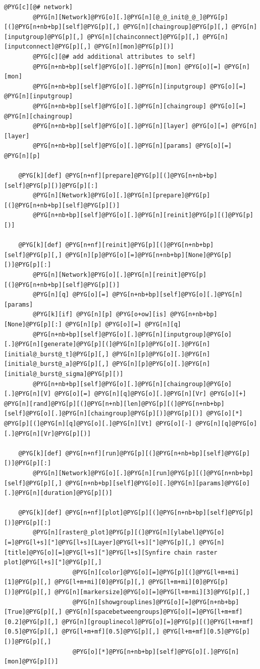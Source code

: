 \documentclass[letterpaper,10pt,english]{manual}
\begin{document}
\begin{Verbatim}[commandchars=@\[\]]
        @PYG[c][@# network]
        @PYG[n][Network]@PYG[o][.]@PYG[n][@_@_init@_@_]@PYG[p][(]@PYG[n+nb+bp][self]@PYG[p][,] @PYG[n][chaingroup]@PYG[p][,] @PYG[n][inputgroup]@PYG[p][,] @PYG[n][chainconnect]@PYG[p][,] @PYG[n][inputconnect]@PYG[p][,] @PYG[n][mon]@PYG[p][)]
        @PYG[c][@# add additional attributes to self]
        @PYG[n+nb+bp][self]@PYG[o][.]@PYG[n][mon] @PYG[o][=] @PYG[n][mon]
        @PYG[n+nb+bp][self]@PYG[o][.]@PYG[n][inputgroup] @PYG[o][=] @PYG[n][inputgroup]
        @PYG[n+nb+bp][self]@PYG[o][.]@PYG[n][chaingroup] @PYG[o][=] @PYG[n][chaingroup]
        @PYG[n+nb+bp][self]@PYG[o][.]@PYG[n][layer] @PYG[o][=] @PYG[n][layer]
        @PYG[n+nb+bp][self]@PYG[o][.]@PYG[n][params] @PYG[o][=] @PYG[n][p]

    @PYG[k][def] @PYG[n+nf][prepare]@PYG[p][(]@PYG[n+nb+bp][self]@PYG[p][)]@PYG[p][:]
        @PYG[n][Network]@PYG[o][.]@PYG[n][prepare]@PYG[p][(]@PYG[n+nb+bp][self]@PYG[p][)]
        @PYG[n+nb+bp][self]@PYG[o][.]@PYG[n][reinit]@PYG[p][(]@PYG[p][)]

    @PYG[k][def] @PYG[n+nf][reinit]@PYG[p][(]@PYG[n+nb+bp][self]@PYG[p][,] @PYG[n][p]@PYG[o][=]@PYG[n+nb+bp][None]@PYG[p][)]@PYG[p][:]
        @PYG[n][Network]@PYG[o][.]@PYG[n][reinit]@PYG[p][(]@PYG[n+nb+bp][self]@PYG[p][)]
        @PYG[n][q] @PYG[o][=] @PYG[n+nb+bp][self]@PYG[o][.]@PYG[n][params]
        @PYG[k][if] @PYG[n][p] @PYG[o+ow][is] @PYG[n+nb+bp][None]@PYG[p][:] @PYG[n][p] @PYG[o][=] @PYG[n][q]
        @PYG[n+nb+bp][self]@PYG[o][.]@PYG[n][inputgroup]@PYG[o][.]@PYG[n][generate]@PYG[p][(]@PYG[n][p]@PYG[o][.]@PYG[n][initial@_burst@_t]@PYG[p][,] @PYG[n][p]@PYG[o][.]@PYG[n][initial@_burst@_a]@PYG[p][,] @PYG[n][p]@PYG[o][.]@PYG[n][initial@_burst@_sigma]@PYG[p][)]
        @PYG[n+nb+bp][self]@PYG[o][.]@PYG[n][chaingroup]@PYG[o][.]@PYG[n][V] @PYG[o][=] @PYG[n][q]@PYG[o][.]@PYG[n][Vr] @PYG[o][+] @PYG[n][rand]@PYG[p][(]@PYG[n+nb][len]@PYG[p][(]@PYG[n+nb+bp][self]@PYG[o][.]@PYG[n][chaingroup]@PYG[p][)]@PYG[p][)] @PYG[o][*] @PYG[p][(]@PYG[n][q]@PYG[o][.]@PYG[n][Vt] @PYG[o][-] @PYG[n][q]@PYG[o][.]@PYG[n][Vr]@PYG[p][)]

    @PYG[k][def] @PYG[n+nf][run]@PYG[p][(]@PYG[n+nb+bp][self]@PYG[p][)]@PYG[p][:]
        @PYG[n][Network]@PYG[o][.]@PYG[n][run]@PYG[p][(]@PYG[n+nb+bp][self]@PYG[p][,] @PYG[n+nb+bp][self]@PYG[o][.]@PYG[n][params]@PYG[o][.]@PYG[n][duration]@PYG[p][)]

    @PYG[k][def] @PYG[n+nf][plot]@PYG[p][(]@PYG[n+nb+bp][self]@PYG[p][)]@PYG[p][:]
        @PYG[n][raster@_plot]@PYG[p][(]@PYG[n][ylabel]@PYG[o][=]@PYG[l+s]["]@PYG[l+s][Layer]@PYG[l+s]["]@PYG[p][,] @PYG[n][title]@PYG[o][=]@PYG[l+s]["]@PYG[l+s][Synfire chain raster plot]@PYG[l+s]["]@PYG[p][,]
                   @PYG[n][color]@PYG[o][=]@PYG[p][(]@PYG[l+m+mi][1]@PYG[p][,] @PYG[l+m+mi][0]@PYG[p][,] @PYG[l+m+mi][0]@PYG[p][)]@PYG[p][,] @PYG[n][markersize]@PYG[o][=]@PYG[l+m+mi][3]@PYG[p][,]
                   @PYG[n][showgrouplines]@PYG[o][=]@PYG[n+nb+bp][True]@PYG[p][,] @PYG[n][spacebetweengroups]@PYG[o][=]@PYG[l+m+mf][0.2]@PYG[p][,] @PYG[n][grouplinecol]@PYG[o][=]@PYG[p][(]@PYG[l+m+mf][0.5]@PYG[p][,] @PYG[l+m+mf][0.5]@PYG[p][,] @PYG[l+m+mf][0.5]@PYG[p][)]@PYG[p][,]
                   @PYG[o][*]@PYG[n+nb+bp][self]@PYG[o][.]@PYG[n][mon]@PYG[p][)]


\end{Verbatim}
\end{document}
